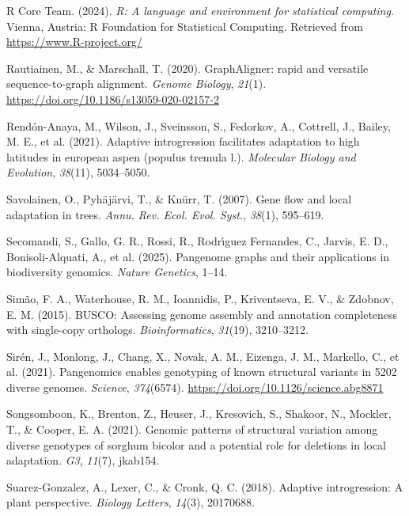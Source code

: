 \documentclass[
]{agujournal2019}
\newlength{\cslhangindent}
\newenvironment{CSLReferences}[2] %
 {\begin{list}{}{%
  \setlength{\itemindent}{0pt}
  \setlength{\leftmargin}{0pt}
  \setlength{\parsep}{0pt}
  \ifodd #1
   \setlength{\leftmargin}{\cslhangindent}
   \setlength{\itemindent}{-1\cslhangindent}
  \fi
  \setlength{\itemsep}{#2\baselineskip}}}
 {\end{list}}
\begin{document}
\begin{CSLReferences}{1}{0}
R Core Team. (2024). \emph{R: A language and environment for statistical
computing}. Vienna, Austria: R Foundation for Statistical Computing.
Retrieved from \url{https://www.R-project.org/}

Rautiainen, M., \& Marschall, T. (2020). GraphAligner: rapid and
versatile sequence-to-graph alignment. \emph{Genome Biology},
\emph{21}(1). \url{https://doi.org/10.1186/s13059-020-02157-2}

Rendón-Anaya, M., Wilson, J., Sveinsson, S., Fedorkov, A., Cottrell, J.,
Bailey, M. E., et al. (2021). Adaptive introgression facilitates
adaptation to high latitudes in european aspen (populus tremula l.).
\emph{Molecular Biology and Evolution}, \emph{38}(11), 5034--5050.

Savolainen, O., Pyhäjärvi, T., \& Knürr, T. (2007). Gene flow and local
adaptation in trees. \emph{Annu. Rev. Ecol. Evol. Syst.}, \emph{38}(1),
595--619.

Secomandi, S., Gallo, G. R., Rossi, R., Rodrı́guez Fernandes, C., Jarvis,
E. D., Bonisoli-Alquati, A., et al. (2025). Pangenome graphs and their
applications in biodiversity genomics. \emph{Nature Genetics}, 1--14.

Simão, F. A., Waterhouse, R. M., Ioannidis, P., Kriventseva, E. V., \&
Zdobnov, E. M. (2015). BUSCO: Assessing genome assembly and annotation
completeness with single-copy orthologs. \emph{Bioinformatics},
\emph{31}(19), 3210--3212.

Sirén, J., Monlong, J., Chang, X., Novak, A. M., Eizenga, J. M.,
Markello, C., et al. (2021). Pangenomics enables genotyping of known
structural variants in 5202 diverse genomes. \emph{Science},
\emph{374}(6574). \url{https://doi.org/10.1126/science.abg8871}

Songsomboon, K., Brenton, Z., Heuser, J., Kresovich, S., Shakoor, N.,
Mockler, T., \& Cooper, E. A. (2021). Genomic patterns of structural
variation among diverse genotypes of sorghum bicolor and a potential
role for deletions in local adaptation. \emph{G3}, \emph{11}(7),
jkab154.

Suarez-Gonzalez, A., Lexer, C., \& Cronk, Q. C. (2018). Adaptive
introgression: A plant perspective. \emph{Biology Letters},
\emph{14}(3), 20170688.


\end{CSLReferences}
\end{document}
